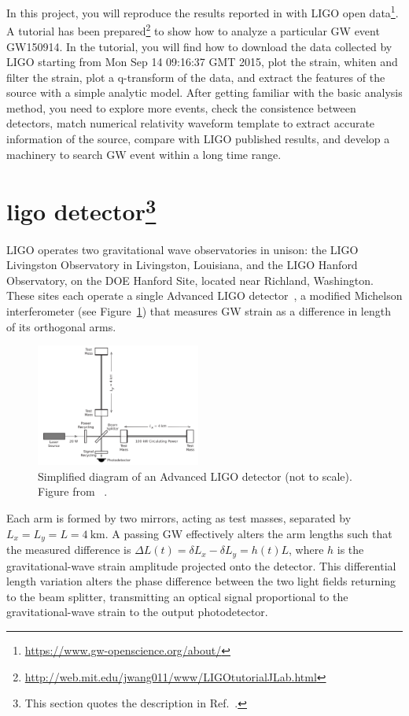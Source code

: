 \documentclass[twoside,twocolumn]{article}
\begin{document}
In this project, you will reproduce the results reported in \cite{PhysRevLett.116.061102} with LIGO open data\footnote{\url{https://www.gw-openscience.org/about/}}. A tutorial has been prepared\footnote{\url{http://web.mit.edu/jwang011/www/LIGOtutorialJLab.html}} to show how to analyze a particular GW event GW150914. In the tutorial, you will find how to download the data collected by LIGO starting from Mon Sep 14 09:16:37 GMT 2015, plot the strain, whiten and filter the strain, plot a q-transform of the data, and extract the features of the source with a simple analytic model. After getting familiar with the basic analysis method, you need to explore more events, check the consistence between detectors, match numerical relativity waveform template to extract accurate information of the source, compare with LIGO published results, and develop a machinery to search GW event within a long time range.


\section[LIGO detector]{ligo detector\footnote{This section quotes the description in Ref.~\cite{PhysRevLett.116.061102}.}}\label{sec:detector}
LIGO operates two gravitational wave observatories in unison: the LIGO Livingston Observatory in Livingston, Louisiana, and the LIGO Hanford Observatory, on the DOE Hanford Site, located near Richland, Washington. These sites each operate a single Advanced LIGO detector~\cite{2015AdvancedLIGO}, a modified Michelson interferometer (see Figure~\ref{fig:detector.interf}) that measures GW strain as a difference in length of its orthogonal arms.
\begin{figure}[hbpt]
  \begin{center}
    \includegraphics[width=0.48\textwidth]{figure/interference.png}
  \end{center}
  \caption{Simplified diagram of an Advanced LIGO detector (not to scale). Figure from ~\cite{PhysRevLett.116.061102}.}
  \label{fig:detector.interf}
\end{figure}
Each arm is formed by two mirrors, acting as test masses, separated by $L_{x} = L_{y} = L = 4~\mathrm{km}$. A passing GW effectively alters the arm lengths such that the measured difference is $\Delta L(t) = \delta L_{x}-\delta L_{y} = h(t)L$, where $h$ is the gravitational-wave strain amplitude projected onto the detector. This differential length variation alters the phase difference between the two light fields returning to the beam splitter, transmitting an optical signal proportional to the gravitational-wave strain to the output photodetector.
\end{document}
